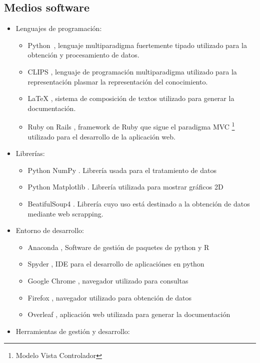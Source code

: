 \documentclass[11pt,a4paper,twoside,final]{article}
\begin{document}
\subsection{Medios software}
\begin{itemize}
    \item Lenguajes de programación:
    \begin{itemize}
        \item Python~\cite{python}, lenguaje multiparadigma fuertemente tipado utilizado para la obtención y procesamiento de datos.
        \item CLIPS \cite{clips}, lenguaje de programación multiparadigma utilizado para la representación plasmar la representación del conocimiento.
        \item LaTeX \cite{latex}, sistema de composición de textos utilizado para generar la documentación.
        \item Ruby on Rails \cite{ror}, framework de Ruby que sigue el paradigma MVC \footnote{Modelo Vista Controlador} utilizado para el desarrollo de la aplicación web.
    \end{itemize}
    \item Librerías:
    \begin{itemize}
        \item Python NumPy \cite{numpy}. Librería usada para el tratamiento de datos
        \item Python Matplotlib \cite{matplotlib}. Librería utilizada para mostrar gráficos 2D
        \item BeatifulSoup4 \cite{beatifulsoup}. Librería cuyo uso está destinado a la obtención de datos mediante web scrapping.
    \end{itemize}
    \item Entorno de desarrollo:
    \begin{itemize}
        \item Anaconda \cite{anaconda}, Software de gestión de paquetes de python y R
        \item Spyder \cite{spyder}, IDE para el desarrollo de aplicaciónes en python
        \item Google Chrome \cite{chrome}, navegador utilizado para consultas
        \item Firefox \cite{firefox}, navegador utilizado para obtención de datos
        \item Overleaf \cite{overleaf}, aplicación web utilizada para generar la documentación
    \end{itemize}
    \item Herramientas de gestión y desarrollo:

\end{itemize}
\end{document}
